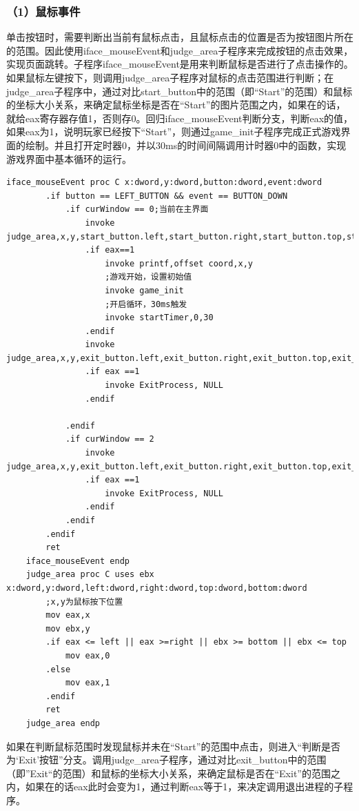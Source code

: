 \subsubsection{（1）鼠标事件}
单击按钮时，需要判断出当前有鼠标点击，且鼠标点击的位置是否为按钮图片所在的范围。因此使用iface\_mouseEvent和judge\_area子程序来完成按钮的点击效果，实现页面跳转。子程序iface\_mouseEvent是用来判断鼠标是否进行了点击操作的。如果鼠标左键按下，则调用judge\_area子程序对鼠标的点击范围进行判断；在judge\_area子程序中，通过对比start\_button中的范围（即“Start”的范围）和鼠标的坐标大小关系，来确定鼠标坐标是否在“Start”的图片范围之内，如果在的话，就给eax寄存器存值1，否则存0。回归iface\_mouseEvent判断分支，判断eax的值，如果eax为1，说明玩家已经按下“Start”，则通过game\_init子程序完成正式游戏界面的绘制。并且打开定时器0，并以30ms的时间间隔调用计时器0中的函数，实现游戏界面中基本循环的运行。
\begin{lstlisting}[language={[x86masm]Assembler}]
    iface_mouseEvent proc C x:dword,y:dword,button:dword,event:dword
        .if button == LEFT_BUTTON && event == BUTTON_DOWN
            .if	curWindow == 0;当前在主界面
                invoke judge_area,x,y,start_button.left,start_button.right,start_button.top,start_button.bottom
                .if eax==1
                    invoke printf,offset coord,x,y
                    ;游戏开始，设置初始值
                    invoke game_init
                    ;开启循环，30ms触发
                    invoke startTimer,0,30
                .endif
                invoke judge_area,x,y,exit_button.left,exit_button.right,exit_button.top,exit_button.bottom
                .if eax ==1
                    invoke ExitProcess, NULL
                .endif

            .endif
            .if curWindow == 2
                invoke judge_area,x,y,exit_button.left,exit_button.right,exit_button.top,exit_button.bottom
                .if eax ==1
                    invoke ExitProcess, NULL
                .endif
            .endif
        .endif
        ret
    iface_mouseEvent endp
    judge_area proc C uses ebx x:dword,y:dword,left:dword,right:dword,top:dword,bottom:dword
        ;x,y为鼠标按下位置
        mov eax,x
        mov ebx,y
        .if	eax <= left || eax >=right || ebx >= bottom || ebx <= top
            mov eax,0
        .else	
            mov eax,1
        .endif	
        ret
    judge_area endp
\end{lstlisting}
\par
如果在判断鼠标范围时发现鼠标并未在“Start”的范围中点击，则进入“判断是否为‘Exit’按钮”分支。调用judge\_area子程序，通过对比exit\_button中的范围（即”Exit“的范围）和鼠标的坐标大小关系，来确定鼠标是否在“Exit”的范围之内，如果在的话eax此时会变为1，通过判断eax等于1，来决定调用退出进程的子程序。
